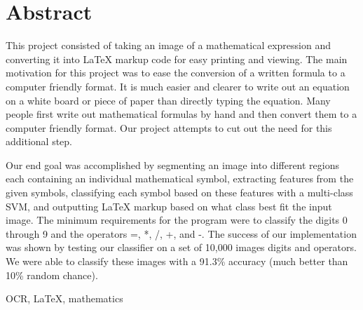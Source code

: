 \section{Abstract}

This project consisted of taking an image of a mathematical expression and converting it into LaTeX markup code for easy printing and viewing.  The main motivation for this project was to ease the conversion of a written formula to a computer friendly format.  It is much easier and clearer to write out an equation on a white board or piece of paper than directly typing the equation. Many people first write out mathematical formulas by hand and then convert them to a computer friendly format.  Our project attempts to cut out the need for this additional step.  

Our end goal was accomplished by segmenting an image into different regions each containing an individual mathematical symbol, extracting features from the given symbols, classifying each symbol based on these features with a multi-class SVM, and outputting LaTeX markup based on what class best fit the input image.  The minimum requirements for the program were to classify the digits 0 through 9 and the operators =, *, /, +, and -.  The success of our implementation was shown by testing our classifier on a set of 10,000 images digits and operators. We were able to classify these images with a 91.3\% accuracy (much better than 10\% random chance).

\begin{keywords}
OCR, LaTeX, mathematics
\end{keywords}